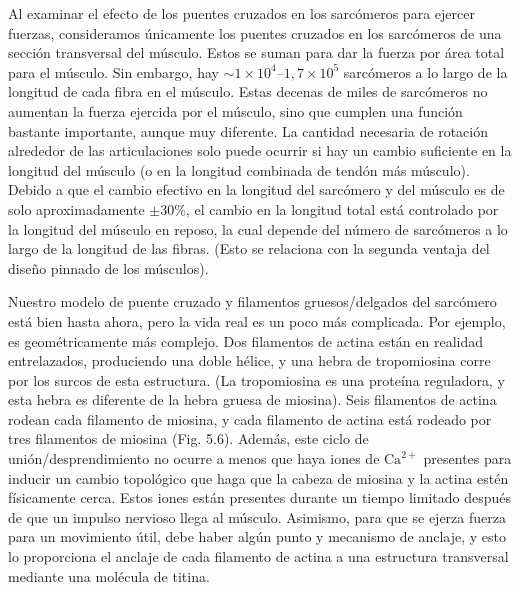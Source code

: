 \documentclass[12pt]{book}
\begin{document}
Al examinar el efecto de los puentes cruzados en los sarcómeros para ejercer fuerzas, consideramos únicamente los puentes cruzados en los sarcómeros de una sección transversal del músculo. Estos se suman para dar la fuerza por área total para el músculo. Sin embargo, hay $\sim 1 \times 10^4\text{--}1{,}7 \times 10^5$ sarcómeros a lo largo de la longitud de cada fibra en el músculo. Estas decenas de miles de sarcómeros no aumentan la fuerza ejercida por el músculo, sino que cumplen una función bastante importante, aunque muy diferente. La cantidad necesaria de rotación alrededor de las articulaciones solo puede ocurrir si hay un cambio suficiente en la longitud del músculo (o en la longitud combinada de tendón más músculo). Debido a que el cambio efectivo en la longitud del sarcómero y del músculo es de solo aproximadamente $\pm 30\%$, el cambio en la longitud total está controlado por la longitud del músculo en reposo, la cual depende del número de sarcómeros a lo largo de la longitud de las fibras. (Esto se relaciona con la segunda ventaja del diseño pinnado de los músculos).


Nuestro modelo de puente cruzado y filamentos gruesos/delgados del sarcómero está bien hasta ahora, pero la vida real es un poco más complicada. Por ejemplo, es geométricamente más complejo. Dos filamentos de actina están en realidad entrelazados, produciendo una doble hélice, y una hebra de tropomiosina corre por los surcos de esta estructura. (La tropomiosina es una proteína reguladora, y esta hebra es diferente de la hebra gruesa de miosina). Seis filamentos de actina rodean cada filamento de miosina, y cada filamento de actina está rodeado por tres filamentos de miosina (Fig. 5.6). Además, este ciclo de unión/desprendimiento no ocurre a menos que haya iones de $\text{Ca}^{2+}$ presentes para inducir un cambio topológico que haga que la cabeza de miosina y la actina estén físicamente cerca. Estos iones están presentes durante un tiempo limitado después de que un impulso nervioso llega al músculo. Asimismo, para que se ejerza fuerza para un movimiento útil, debe haber algún punto y mecanismo de anclaje, y esto lo proporciona el anclaje de cada filamento de actina a una estructura transversal mediante una molécula de titina.
\end{document}
